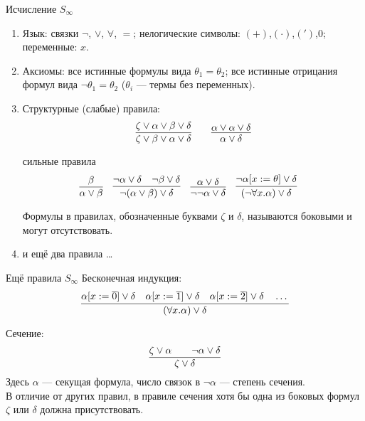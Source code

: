 \documentclass[aspectratio=169]{beamer}
\begin{document}
\begin{frame}{Исчисление $S_\infty$}
\begin{enumerate}
\item Язык: связки $\neg$, $\vee$, $\forall$, $=$; нелогические символы: $(+)$,$(\cdot)$,$(')$,$0$; переменные: $x$.
\item Аксиомы: все истинные формулы вида $\theta_1=\theta_2$; все истинные отрицания формул вида $\neg\theta_1=\theta_2$
($\theta_i$ --- термы без переменных).
\item Структурные (слабые) правила:
$$\infer{\zeta\vee\beta\vee\alpha\vee\delta}{\zeta\vee\alpha\vee\beta\vee\delta} \quad\quad
\infer{\alpha\vee\delta}{\alpha\vee\alpha\vee\delta}$$

сильные правила
$$\infer{\alpha\vee\beta}{\beta}\quad
\infer{\neg(\alpha\vee\beta)\vee\delta}{\neg\alpha\vee\delta\quad\neg\beta\vee\delta}\quad
\infer{\neg\neg\alpha\vee\delta}{\alpha\vee\delta}\quad
\infer{(\neg\forall x.\alpha)\vee\delta}{\neg\alpha[x := \theta]\vee\delta}\quad$$

Формулы в правилах, обозначенные буквами $\zeta$ и $\delta$, называются боковыми и могут отсутствовать.
\item и ещё два правила \dots
\end{enumerate}
\end{frame}

\begin{frame}{Ещё правила $S_\infty$}
Бесконечная индукция:
$$\infer{(\forall x.\alpha)\vee\delta}{\alpha[x:=\overline{0}]\vee\delta
                                  \quad\alpha[x:=\overline{1}]\vee\delta
                                  \quad\alpha[x:=\overline{2}]\vee\delta\quad\dots}$$

Сечение:
$$\infer{\zeta\vee\delta}{\zeta\vee\alpha\quad\quad\neg\alpha\vee\delta}$$
Здесь $\alpha$ --- секущая формула, число связок в $\neg\alpha$ --- степень сечения.\\
В отличие от других правил, в правиле сечения хотя бы одна из боковых формул $\zeta$ или $\delta$ должна присутствовать.
\end{frame}
\end{document}
